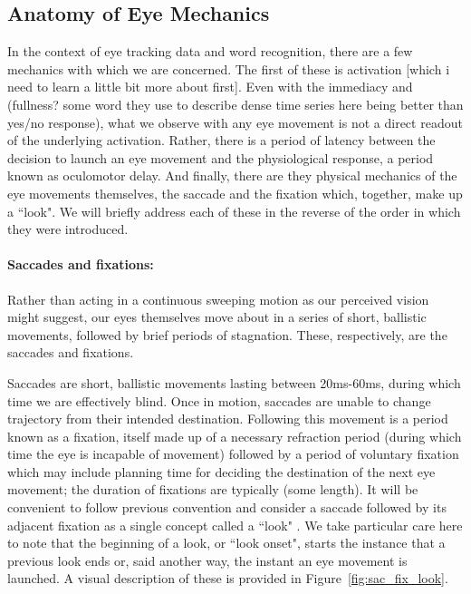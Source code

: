 \subsection{Anatomy of Eye Mechanics }

In the context of eye tracking data and word recognition, there are a few mechanics with which we are concerned. The first of these is activation [which i need to learn a little bit more about first]. Even with the immediacy and (fullness? some word they use to describe dense time series here being better than yes/no response), what we observe with any eye movement is not a direct readout of the underlying activation.  Rather, there is a period of latency between the decision to launch an eye movement and the physiological response, a period known as oculomotor delay. And finally, there are they physical mechanics of the eye movements themselves, the saccade and the fixation which, together, make up a ``look". We will briefly address each of these in the reverse of the order in which they were introduced.



\paragraph{Saccades and fixations:} Rather than acting in a continuous sweeping motion as our perceived vision might suggest, our eyes themselves move about in a series of short, ballistic movements, followed by brief periods of stagnation. These, respectively, are the saccades and fixations. 

Saccades are short, ballistic movements lasting between 20ms-60ms, during which time we are effectively blind. Once in motion, saccades are unable to change trajectory from their intended destination. Following this movement is a period known as a fixation, itself made up of a necessary refraction period (during which time the eye is incapable of movement) followed by a period of voluntary fixation which may include planning time for deciding the destination of the next eye movement; the duration of fixations are typically (some length). It will be convenient to follow previous convention and consider a saccade followed by its adjacent fixation as a single concept called a ``look" \cite{mcmurray2002look}. We take particular care here to note that the beginning of a look, or ``look onset", starts the instance that a previous look ends or, said another way, the instant an eye movement is launched. A visual description of these is provided in Figure~\ref{fig:sac_fix_look}.



